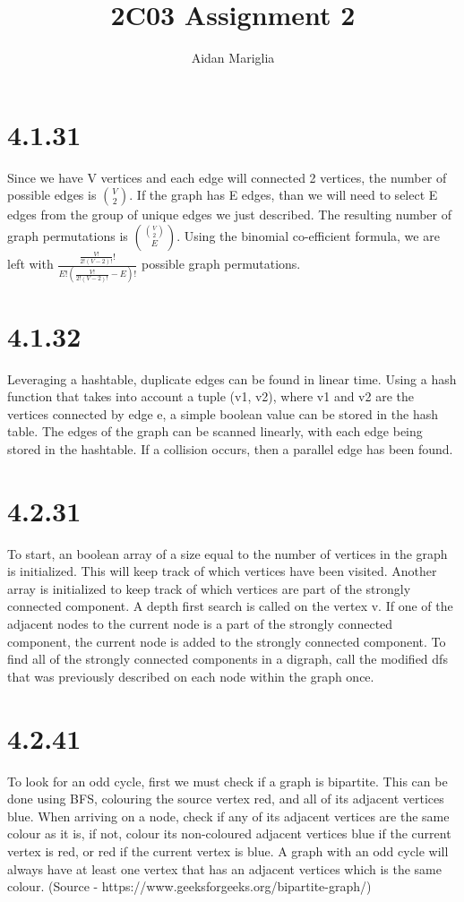 \documentclass[12pt]{article}
\title{2C03 Assignment 2}
\author{Aidan Mariglia}
\begin{document}
\maketitle


\section*{4.1.31}
Since we have V vertices and each edge will connected 2 vertices, the number of
possible edges is $\binom{V}{2}$. If the graph has E edges, than we will need to
select E edges from the group of unique edges we just described. The resulting
number of graph permutations is $\binom{\binom{V}{2}}{E}$. Using the binomial
co-efficient formula, we are left with $\frac{\frac{V!}{2!(V - 2)!}!}{E!(\frac{V!}{2!(V - 2)!} - E)!}$
possible graph permutations.

\section*{4.1.32}
Leveraging a hashtable, duplicate edges can be found in linear time.
Using a hash function that takes into account a tuple (v1, v2), where v1 and
v2 are the vertices connected by edge e, a simple boolean value can be stored
in the hash table. The edges of the graph can be scanned linearly, with each
edge being stored in the hashtable. If a collision occurs, then a parallel
edge has been found.

\section*{4.2.31}
To start, an boolean array of a size equal to the number of vertices in the 
graph is initialized. This will keep track of which vertices have been visited.
Another array is initialized to keep track of which vertices are part of the
strongly connected component. A depth first search is called on the vertex v.
If one of the adjacent nodes to the current node is a part of the strongly connected
component, the current node is added to the strongly connected component. To
find all of the strongly connected components in a digraph, call the modified
dfs that was previously described on each node within the graph once.

\section*{4.2.41}
To look for an odd cycle, first we must check if a graph is bipartite.
This can be done using BFS, colouring the source vertex red, and all of its
adjacent vertices blue. When arriving on a node, check if any of its adjacent
vertices are the same colour as it is, if not, colour its non-coloured adjacent
vertices blue if the current vertex is red, or red if the current vertex is blue.
A graph with an odd cycle will always have at least one vertex that has an adjacent
vertices which is the same colour.
(Source - https://www.geeksforgeeks.org/bipartite-graph/)
\end{document}
